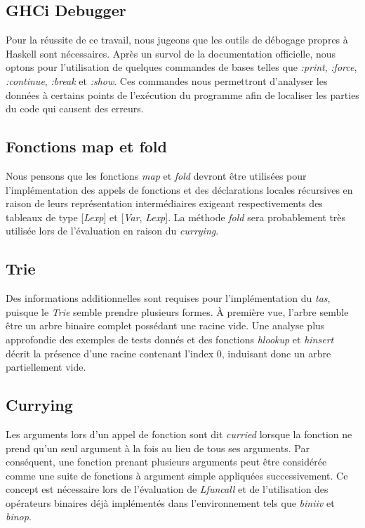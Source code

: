 \documentclass[12pt]{article}
\begin{document}
\subsection{GHCi Debugger}
Pour la réussite de ce travail, nous jugeons que les outils de débogage propres à Haskell sont nécessaires. Après un survol de la documentation officielle, nous optons pour l'utilisation de quelques commandes de bases telles que \textit{:print}, \textit{:force}, \textit{:continue}, \textit{:break} et \textit{:show}. Ces commandes nous permettront d'analyser les données à certains points de l'exécution du programme afin de localiser les parties du code qui causent des erreurs.

\subsection{Fonctions map et fold}
Nous pensons que les fonctions \textit{map} et \textit{fold} devront être utilisées pour l'implémentation des appels de fonctions et des déclarations locales récursives en raison de leurs représentation intermédiaires exigeant respectivements des tableaux de type [\textit{Lexp}] et [\textit{Var}, \textit{Lexp}]. La méthode \textit{fold} sera probablement très utilisée lors de l'évaluation en raison du \textit{currying}.

\subsection{Trie}
Des informations additionnelles sont requises pour l'implémentation du \textit{tas}, puisque le \textit{Trie} semble prendre plusieurs formes. À première vue, l'arbre semble être un arbre binaire complet possédant une racine vide. Une analyse plus approfondie des exemples de tests donnés et des fonctions \textit{hlookup} et \textit{hinsert} décrit la présence d'une racine contenant l'index 0, induisant donc un arbre partiellement vide.

\subsection{Currying}
Les arguments lors d'un appel de fonction sont dit \textit{curried} lorsque la fonction ne prend qu'un seul argument à la fois au lieu de tous ses arguments. Par conséquent, une fonction prenant plusieurs arguments peut être considérée comme une suite de fonctions à argument simple appliquées successivement. Ce concept est nécessaire lors de l'évaluation de \textit{Lfuncall} et de l'utilisation des opérateurs binaires déjà implémentés dans l'environnement tels que \textit{biniiv} et \textit{binop}.
\end{document}
